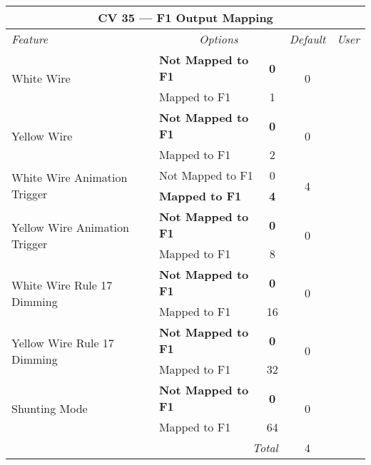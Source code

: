 \documentclass[12pt,letterpaper,draft]{memoir} %
\begin{document}
\label{CV35}
\begin{center}
\begin{tabular}{|l|lc|c|c|}
\hline
\multicolumn{5}{|c|}{\textbf{CV 35 --- F1 Output Mapping}} \\ \hline \hline
\textit{Feature} & \multicolumn{2}{c|}{\textit{Options}} & \textit{Default} & \textit{User} \\ \hline
\multirow{2}{*}{White Wire} & \textbf{Not Mapped to F1} & \textbf{0}	& 	\multirow{2}{*}{0}&\\
                            & Mapped to F1 & 1 & & \\ \hline
\multirow{2}{*}{Yellow Wire} & \textbf{Not Mapped to F1} & \textbf{0}	& 	\multirow{2}{*}{0}&\\
                            & Mapped to F1 & 2 & & \\ \hline
\multirow{2}{*}{White Wire Animation Trigger} & Not Mapped to F1 & 0	& 	\multirow{2}{*}{4}& \\
                           & \textbf{Mapped to F1} & \textbf{4} & & \\ \hline
\multirow{2}{*}{Yellow Wire Animation Trigger} & \textbf{Not Mapped to F1} & \textbf{0}	& 	\multirow{2}{*}{0}&\\
                             & Mapped to F1 & 8 & & \\ \hline
\multirow{2}{*}{White Wire Rule 17 Dimming} & \textbf{Not Mapped to F1} & \textbf{0}	& 	\multirow{2}{*}{0}& \\
                             & Mapped to F1 & 16 & & \\ \hline
\multirow{2}{*}{Yellow Wire Rule 17 Dimming} & \textbf{Not Mapped to F1} & \textbf{0}	& 	\multirow{2}{*}{0}& \\
                           & Mapped to F1 & 32 & & \\ \hline
\multirow{2}{*}{Shunting Mode} & \textbf{Not Mapped to F1} & \textbf{0}	& 	\multirow{2}{*}{0}&\\
                             & Mapped to F1 & 64 & & \\ \hline\hline
\multicolumn{3}{|r|}{\textit{Total}} & 4 &\\ \hline
\end{tabular}
\end{center}
\end{document}

